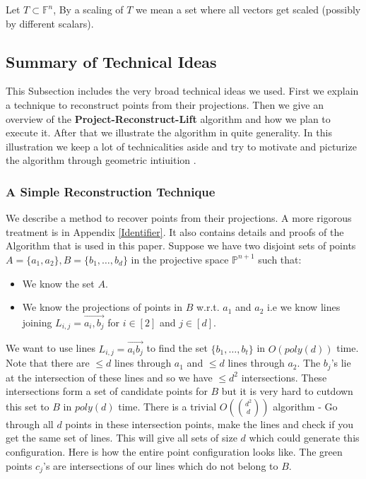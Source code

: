 \documentclass[letterpaper,USenglish,numberwithinsect]{lipics}
\newcommand{\F}{\mathbb{F}}
\newcommand{\MP}{\mathbb{P}}
\begin{document}
Let $T\subset \F^n$, By a scaling of $T$ we mean a set where all vectors get scaled (possibly by different scalars).





\subsection{Summary of Technical Ideas}
This Subsection includes the very broad technical ideas we used. First we explain a technique to
reconstruct points from their projections. Then we give an overview of the {\bf  Project-Reconstruct-Lift} algorithm
and how we plan to execute it. After that we illustrate the algorithm in quite generality. In this illustration we
keep a lot of technicalities aside and try to motivate and picturize the algorithm through geometric intiuition .

\subsubsection{A Simple Reconstruction Technique}\label{project}
We describe a method to recover points from their projections. A more rigorous treatment is in Appendix \ref{Identifier}. It
also contains details and proofs of the Algorithm that is used in this paper.
Suppose we have two disjoint sets of points $A = \{a_1,a_2\},B = \{b_1,\ldots,b_d\}$ in the projective space $\MP^{n+1}$ such that:
\begin{itemize}
 \item We know the set $A$.
 \item We know the projections of points in $B$ w.r.t. $a_1$ and $a_2$ i.e we know lines
 joining $L_{i,j}=\overrightarrow{a_i,b_j}$ for $i\in [2]$ and $j\in [d]$.
 \end{itemize}
 We want to use lines $L_{i,j} = \overrightarrow{a_ib_j}$ to find the set $\{b_1,\ldots,b_t\}$ in $O(poly(d))$ time. Note that
there are $\leq d$ lines through $a_1$ and $\leq d$ lines through $a_2$. The $b_j$'s lie at the intersection of these
lines and so we have $\leq d^2$ intersections. These intersections form a set of candidate points for $B$ but it is very hard to cutdown
this set to $B$ in $poly(d)$ time. There is a trivial $O({d^2 \choose d})$ algorithm  - Go through all $d$ points in these
intersection points, make the lines and check if you get the same set of lines. This will give all sets of size $d$ which
could generate this configuration. Here is how the entire point configuration looks like. The green points $c_j$'s are intersections
of our lines which do not belong to $B$.
\end{document}
